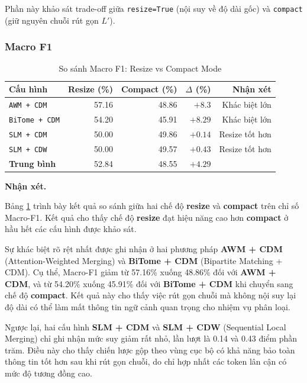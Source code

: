 Phần này khảo sát trade-off giữa \texttt{resize=True} (nội suy về độ
dài gốc) và \texttt{compact} (giữ nguyên chuỗi rút gọn $L'$).

\subsubsection*{Macro F1}

\begin{table}[H]
\centering
\small
\caption{So sánh Macro F1: Resize vs Compact Mode}
\label{tab:compact_vs_resize_micro}
\begin{tabular}{@{}lrrrr@{}}
\toprule
\textbf{Cấu hình} & \textbf{Resize (\%)} & \textbf{Compact (\%)} & \textbf{$\Delta$ (\%)} & \textbf{Nhận xét} \\
\midrule
\texttt{AWM + CDM}  & 57.16 & 48.86 & $+8.3$ & Khác biệt lớn \\
\texttt{BiTome + CDM}   & 54.20 & 45.91 & $+8.29$ & Khác biệt lớn  \\
\texttt{SLM + CDM}   & 50.00 & 49.86 & $+0.14$ & Resize tốt hơn \\
\texttt{SLM + CDW}   & 50.00 & 49.57 & $+0.43$ & Resize tốt hơn \\
\midrule
\textbf{Trung bình}    & 52.84 & 48.55 & $+4.29$ & \\
\bottomrule
\end{tabular}
\end{table}

\textbf{Nhận xét.}

Bảng \ref{tab:compact_vs_resize_micro} trình bày kết quả so sánh giữa
hai chế độ \textbf{resize} và \textbf{compact} trên chỉ số Macro-F1.
Kết quả cho thấy chế độ \textbf{resize} đạt hiệu năng cao hơn
\textbf{compact} ở hầu hết các cấu hình được khảo sát.

Sự khác biệt rõ rệt nhất được ghi nhận ở hai phương pháp
\textbf{AWM + CDM} (Attention-Weighted Merging) và
\textbf{BiTome + CDM} (Bipartite Matching + CDM).
Cụ thể, Macro-F1 giảm từ 57.16\% xuống 48.86\% đối với
\textbf{AWM + CDM}, và từ 54.20\% xuống 45.91\% đối với
\textbf{BiTome + CDM} khi chuyển sang chế độ \textbf{compact}.
Kết quả này cho thấy việc rút gọn chuỗi mà không nội suy lại
độ dài có thể làm mất thông tin ngữ cảnh quan trọng cho nhiệm vụ phân loại.

Ngược lại, hai cấu hình \textbf{SLM + CDM} và \textbf{SLM + CDW}
(Sequential Local Merging) chỉ ghi nhận mức suy giảm rất nhỏ,
lần lượt là 0.14 và 0.43 điểm phần trăm. Điều này cho thấy chiến lược
gộp theo vùng cục bộ có khả năng bảo toàn thông tin tốt hơn sau khi
rút gọn chuỗi, do chỉ hợp nhất các token lân cận có mức độ tương đồng cao.

